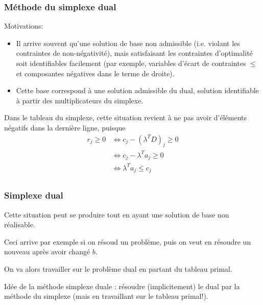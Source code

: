 \documentclass[usepdftitle=false]{beamer}
\begin{document}
\begin{frame}
	\frametitle{Méthode du simplexe dual}
	
	Motivations:
	\begin{itemize}
		\item
		Il arrive souvent qu’une solution de base non admissible (i.e. violant les contraintes de non-négativité), mais satisfaisant les contraintes d'optimalité soit identifiables facilement (par exemple, variables d’écart de contraintes $\leq$ et composantes négatives dans le terme de droite).
		\item
		Cette base correspond à une solution admissible du dual, solution identifiable à partir des multiplicateurs du simplexe.
	\end{itemize}
	
	
	\mbox{}
	
	Dans le tableau du simplexe, cette situation revient à ne pas avoir d'éléments négatifs dans la dernière ligne, puisque
	\begin{align*}
		r_{j} \geq 0 
		& \Leftrightarrow c_{j} - (\lambda^T D)_j \geq 0 \\
		& \Leftrightarrow c_{j} - \lambda^T a_j \geq 0 \\
		& \Leftrightarrow \lambda^T a_j \leq c_j \\
	\end{align*}
	
\end{frame}

\begin{frame}
	\frametitle{Simplexe dual}
	
	Cette situation peut se produire tout en ayant une solution de base non réalisable.
	
	\mbox{}
	
	Ceci arrive par exemple si on résoud un problème, puis on veut en résoudre un nouveau après avoir changé $b$.
	
	\mbox{}
	
	On va alors travailler sur le problème dual en partant du tableau primal.
	
	\mbox{}
	
	Idée de la méthode simplexe duale : résoudre (implicitement) le dual par la méthode du simplexe (mais en travaillant sur le tableau primal!).
	
\end{frame}
\end{document}

